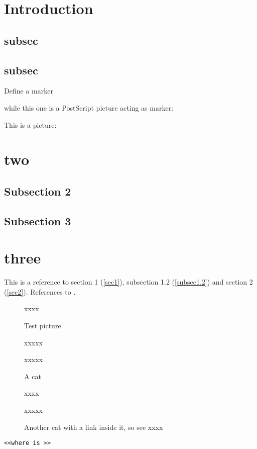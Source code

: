 \documentclass[11pt]{book}
\begin{document}
\section{Introduction}\label{sec1}
\subsection{subsec}
\newpage
\subsection{subsec}\label{subsec1.2}
Define a marker  while this one is a
PostScript picture acting as marker:
\hyperlink{testpiccy}{}

This is a picture: 
\newpage
\section{two}\label{sec2}
\subsection{Subsection 2}
\subsection{Subsection 3}
\newpage
\section{three}
This is a reference to section 1 (\autoref{sec1}), subsection 1.2
(\autoref{subsec1.2}) and section 2 (\autoref{sec2}). References to
\cite{Barcelo:1992:caa,Dallas:aia}.


\begin{figure}

xxxx

\hypertarget{testpiccy}{Test picture}

xxxxx

xxxxx
\caption{{A cat}}
\label{fig1}
\end{figure}

\begin{figure}

xxxx

xxxxx
\caption{Another cat with a link inside it,
so see  \cite{Dallas:aia} xxxx \label{fig2}}
\end{figure}

\texttt{<<where is >>}
\end{document}
